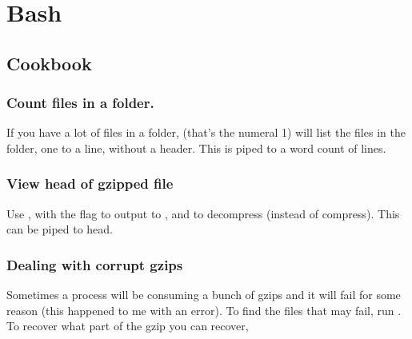 \chapter{Bash}

\section{Cookbook}


\subsection{Count files in a folder.}

If you have a lot of files in a folder,  (that's the numeral 1)
will list the files in the folder, one to a line, without a header.  This
is piped to a word count of lines.




\subsection{View head of gzipped file}

Use , with the  flag to output to , and 
 to decompress (instead of compress).  This can be piped to head.



\subsection{Dealing with corrupt gzips}

Sometimes a process will be consuming a bunch of gzips and it will
fail for some reason (this happened to me with an
 error). To find the files that may fail,
run . To recover what part of the gzip you can recover,
